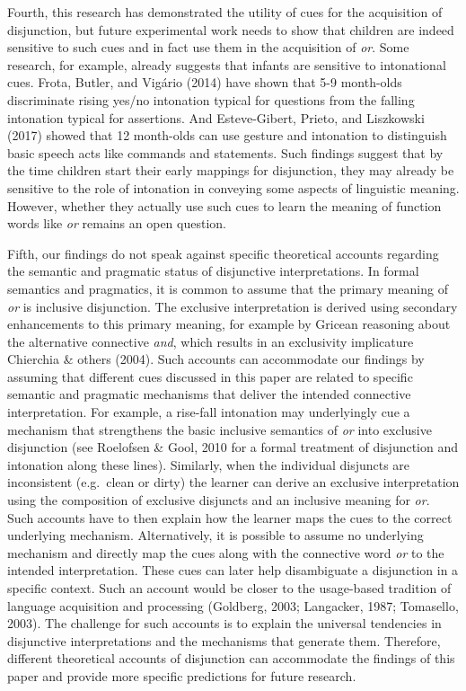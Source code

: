\documentclass[
  english,
  ,man,floatsintext]{apa6}
\begin{document}
Fourth, this research has demonstrated the utility of cues for the acquisition of disjunction, but future experimental work needs to show that children are indeed sensitive to such cues and in fact use them in the acquisition of \emph{or}. Some research, for example, already suggests that infants are sensitive to intonational cues. Frota, Butler, and Vigário (2014) have shown that 5-9 month-olds discriminate rising yes/no intonation typical for questions from the falling intonation typical for assertions. And Esteve-Gibert, Prieto, and Liszkowski (2017) showed that 12 month-olds can use gesture and intonation to distinguish basic speech acts like commands and statements. Such findings suggest that by the time children start their early mappings for disjunction, they may already be sensitive to the role of intonation in conveying some aspects of linguistic meaning. However, whether they actually use such cues to learn the meaning of function words like \emph{or} remains an open question.

Fifth, our findings do not speak against specific theoretical accounts regarding the semantic and pragmatic status of disjunctive interpretations. In formal semantics and pragmatics, it is common to assume that the primary meaning of \emph{or} is inclusive disjunction. The exclusive interpretation is derived using secondary enhancements to this primary meaning, for example by Gricean reasoning about the alternative connective \emph{and}, which results in an exclusivity implicature Chierchia \& others (2004). Such accounts can accommodate our findings by assuming that different cues discussed in this paper are related to specific semantic and pragmatic mechanisms that deliver the intended connective interpretation. For example, a rise-fall intonation may underlyingly cue a mechanism that strengthens the basic inclusive semantics of \emph{or} into exclusive disjunction (see Roelofsen \& Gool, 2010 for a formal treatment of disjunction and intonation along these lines). Similarly, when the individual disjuncts are inconsistent (e.g.~clean or dirty) the learner can derive an exclusive interpretation using the composition of exclusive disjuncts and an inclusive meaning for \emph{or}. Such accounts have to then explain how the learner maps the cues to the correct underlying mechanism. Alternatively, it is possible to assume no underlying mechanism and directly map the cues along with the connective word \emph{or} to the intended interpretation. These cues can later help disambiguate a disjunction in a specific context. Such an account would be closer to the usage-based tradition of language acquisition and processing (Goldberg, 2003; Langacker, 1987; Tomasello, 2003). The challenge for such accounts is to explain the universal tendencies in disjunctive interpretations and the mechanisms that generate them. Therefore, different theoretical accounts of disjunction can accommodate the findings of this paper and provide more specific predictions for future research.
\end{document}
